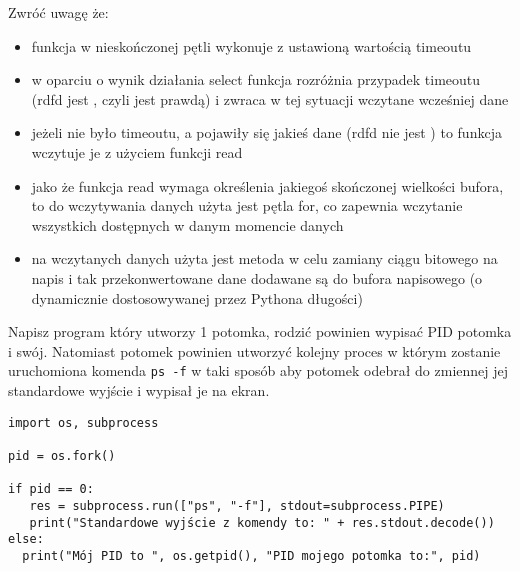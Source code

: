 \noindent Zwróć uwagę że:
\begin{itemize}
\item funkcja w nieskończonej pętli wykonuje  z ustawioną wartością timeoutu
\item w oparciu o wynik działania select funkcja rozróżnia przypadek timeoutu (rdfd jest , czyli  jest prawdą) i zwraca w tej sytuacji wczytane wcześniej dane
\item jeżeli nie było timeoutu, a pojawiły się jakieś dane (rdfd nie jest ) to funkcja wczytuje je z użyciem funkcji read
\item jako że funkcja read wymaga określenia jakiegoś skończonej wielkości bufora, to do wczytywania danych użyta jest pętla for, co zapewnia wczytanie wszystkich dostępnych w danym momencie danych
\item na wczytanych danych użyta jest metoda  w celu zamiany ciągu bitowego na napis i tak przekonwertowane dane dodawane są do bufora napisowego (o dynamicznie dostosowywanej przez Pythona długości)
\end{itemize}
\fi


\dbEntryCheckResults
Napisz program który utworzy 1 potomka, rodzić powinien wypisać PID potomka i swój. Natomiast potomek powinien utworzyć kolejny proces w którym zostanie uruchomiona komenda \Verb#ps -f# w taki sposób aby potomek odebrał do zmiennej jej standardowe wyjście i wypisał je na ekran.
\fi

\dbEntryCheckResults
\begin{verbatim}
import os, subprocess

pid = os.fork()

if pid == 0:
   res = subprocess.run(["ps", "-f"], stdout=subprocess.PIPE)
   print("Standardowe wyjście z komendy to: " + res.stdout.decode())
else:
  print("Mój PID to ", os.getpid(), "PID mojego potomka to:", pid)
\end{verbatim}


